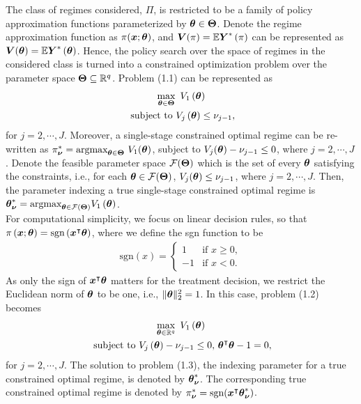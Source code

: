  The class of regimes considered, $\Pi$, is restricted to be a family of policy approximation functions parameterized by $\boldsymbol{\theta} \in \boldsymbol{\Theta}$. Denote the regime approximation function as $\pi(\boldsymbol{x}; \boldsymbol{\theta})$, and $\boldsymbol{V}(\pi) = \mathbb{E} {\boldsymbol{Y}^{*}\left(\pi\right)}$ can be represented as $\boldsymbol{V}(\boldsymbol{\theta}) = \mathbb{E} {\boldsymbol{Y}^{*}\left(\boldsymbol{\theta}\right)}$. Hence, the policy search over the space of regimes in the considered class is turned into a constrained optimization problem over the parameter space $\boldsymbol{\Theta} \subseteq \mathbb{R}^q$. Problem (1.1) can be represented as 
 \begin{equation}
 \begin{gathered}
 \max_{\boldsymbol{\theta} \in \boldsymbol{\Theta}} \,\, V_1\left(\boldsymbol{\theta}\right) \\
 \text{ subject to } V_j\left(\boldsymbol{\theta}\right) \le \nu_{j-1},
 \end{gathered}
 \end{equation}  for $j = 2, \cdots, J$.  Moreover, a single-stage constrained optimal regime can be re-written as $\pi^*_{\boldsymbol{\nu}} = \text{argmax}_{\boldsymbol{\theta} \in \boldsymbol{\Theta}} \,\, V_1(\boldsymbol{\theta})$, subject to $V_j(\boldsymbol{\theta}) - \nu_{j-1} \le 0$, where $j = 2, \cdots, J$. Denote the feasible parameter space $\mathcal{F}(\boldsymbol{\Theta})$ which is the set of every $\boldsymbol{\theta}$ satisfying the constraints, i.e., for each $\boldsymbol{\theta} \in \mathcal{F}(\boldsymbol{\Theta})$, $V_j(\boldsymbol{\theta}) \le \nu_{j-1}$, where $j = 2, \cdots, J$. Then, the parameter indexing a true single-stage constrained optimal regime is $\boldsymbol{\theta}^*_{\boldsymbol{\nu}} = \text{argmax}_{\boldsymbol{\theta}\in \mathcal{F}(\boldsymbol{\Theta})}V_1\left(\boldsymbol{\theta}\right)$. \\
 
 For computational simplicity, we focus on linear decision rules, so that $\pi\left(\boldsymbol{x};\boldsymbol{\theta}\right)=\text{sgn}\left(\boldsymbol{x}^{\intercal}\boldsymbol{\theta}\right)$, where we define the sgn function to be
 \begin{gather*}
 \text{sgn}(x)=\begin{cases}
  1 & \mbox{if }x\ge0,\\
 -1 & \mbox{if }x<0.
 \end{cases}
 \end{gather*}
 As only the sign of $\boldsymbol{x}^{\intercal}\boldsymbol{\theta}$ matters for the treatment decision, we restrict the Euclidean norm of $\boldsymbol{\theta}$ to be one, i.e., $\| \boldsymbol{\theta} \|_2^2=1$. In this case, problem (1.2) becomes
\begin{equation}
\begin{gathered}
\max_{\boldsymbol{\theta} \in \mathbb{R}^q}\,\,  V_1\left(\boldsymbol{\theta}\right) \\
\text{ subject to }  V_j\left(\boldsymbol{\theta}\right) - \nu_{j-1} \le 0, \, \boldsymbol{\theta}^{\intercal}\boldsymbol{\theta} - 1 =0,
\end{gathered}
\end{equation}
for $j = 2, \cdots, J$. The solution to problem (1.3), the indexing parameter for a true constrained optimal regime, is denoted by $\boldsymbol{\theta}_{\boldsymbol{\nu}}^*$. The corresponding true constrained optimal regime is denoted by $\pi_{\boldsymbol{\nu}}^* = \text{sgn}(\boldsymbol{x}^{\intercal}\boldsymbol{\theta}_{\boldsymbol{\nu}}^*)$.
    
